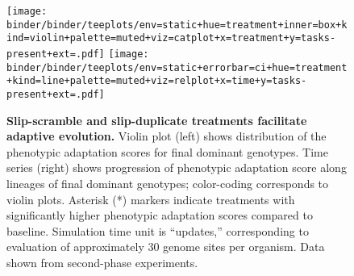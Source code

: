 \begin{figure}[!h]
  \texttt{[image: binder/binder/teeplots/env=static+hue=treatment+inner=box+kind=violin+palette=muted+viz=catplot+x=treatment+y=tasks-present+ext=.pdf]}%
   \texttt{[image: binder/binder/teeplots/env=static+errorbar=ci+hue=treatment+kind=line+palette=muted+viz=relplot+x=time+y=tasks-present+ext=.pdf]}

   \vspace{-2ex}

  \caption{\textbf{Slip-scramble and slip-duplicate treatments facilitate adaptive evolution.}
  \small Violin plot (left) shows distribution of the phenotypic adaptation scores for final dominant genotypes.
  Time series (right) shows progression of phenotypic adaptation score along lineages of final dominant genotypes;
  color-coding corresponds to violin plots.
  Asterisk (*) markers indicate treatments with significantly higher phenotypic adaptation scores compared to baseline.
  Simulation time unit is ``updates,'' corresponding to evaluation of approximately 30 genome sites per organism.
  Data shown from second-phase experiments.
}
  \label{fig:results_panels}
\end{figure}
